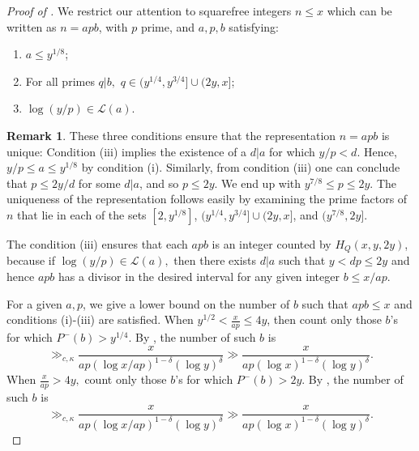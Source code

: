 \documentclass{amsart}
\theoremstyle{definition}
\newtheorem*{remark}{Remark}
\numberwithin{equation}{section}
\newcommand{\density}{\delta}
\begin{document}
	\begin{proof}[Proof of ]
		We restrict our attention to squarefree integers $n \leq x$ which can be written as $n=apb$, with $p$ prime, and $a,p,b$ satisfying:
		\begin{enumerate}[label = (\roman*)]
			\item $a \leq y^{1/8}$;
			\item For all primes $q|b,$ $q \in (y^{1/4},y^{3/4}] \cup (2y,x]$;
			\item $\log(y/p) \in \mathscr{L}(a)$.
		\end{enumerate}
		\begin{remark}
			These three conditions ensure that the representation $n = apb$ is unique: Condition (iii) implies the existence of a $d|a$ for which $y/p < d$. Hence, $y/p \leq a \leq y^{1/8}$ by condition (i). Similarly, from condition (iii) one can conclude that $p \leq 2y/d$ for some $d|a$, and so $p \leq 2y$. We end up with $y^{7/8} \leq p \leq 2y.$ The uniqueness of the representation follows easily by examining the prime factors of $n$ that lie in each of the sets $[2,y^{1/8}]$, $(y^{1/4},y^{3/4}] \cup (2y,x]$, and $(y^{7/8},2y]$. 
		\end{remark}
		The condition (iii) ensures that each $apb$ is an integer counted by $H_Q(x,y,2y)$, because if $\log(y/p) \in \mathscr{L}(a),$ then there exists $d|a$ such that $y < dp \leq 2y$ and hence $apb$ has a divisor in the desired interval for any given integer $b \leq x/ap$.
		
		For a given $a,p$, we give a lower bound on the number of $b$ such that $apb \leq x$ and conditions (i)-(iii) are satisfied. When $y^{1/2} < \frac{x}{ap} \leq 4y$, then count only those $b$'s for which $P^{-}(b) > y^{1/4}$. By , the number of such $b$ is $$\gg_{c,\kappa} \frac{x}{ap (\log x/ap)^{1-\density}(\log y)^{\density}} \gg \frac{x}{ap (\log x)^{1-\density}(\log y)^{\density}}.$$ 
		When $\frac{x}{ap} > 4y,$ count only those $b$'s for which $P^{-}(b) > 2y$. By , the number of such $b$ is $$\gg_{c,\kappa} \frac{x}{ap (\log x/ap)^{1-\density}(\log y)^{\density}} \gg \frac{x}{ap (\log x)^{1-\density}(\log y)^{\density}}.$$
		

\end{proof}
\end{document}
